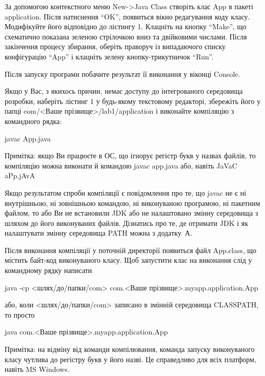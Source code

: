 За допомогою контекстного меню New->Java Class створіть клас App в пакеті application. Після натиснення ``OK'', появиться вікно редагування коду класу. Модифікуйте його відповідно до лістингу 1.
Клацніть на кнопку ``Make'', що схематично показана зеленою стрілочкою вниз та двійковими числами. Після закінчення процесу збирання, оберіть праворуч із випадаючого списку  конфігурацію ``App'' і клацніть зелену кнопку-трикутничок ``Run''.
 
Після запуску програми побачите результат її виконання у віконці Console.

Якщо у Вас, з якихось причин, немає доступу до інтегрованого середовища розробки, наберіть лістинг 1 у будь-якому текстовому редакторі, збережіть його у папці com/<Ваше прізвище>/lab1/application і виконайте компіляцію з командного рядка: 

javac App.java

Примітка: якщо Ви працюєте в ОС, що ігнорує регістр букв у назвах файлів, то компіляцію можна виконати й командою javac app.java або, навіть JaVaC aPp.jAvA

Якщо результатом спроби компіляції є повідомлення про те, що javac не є ні внутрішньою, ні зовнішньою командою, ні виконуваною програмою, ні пакетним файлом, то або Ви не встановили JDK або не налаштовано змінну середовища з шляхом до його виконуваних файлів. Дізнатись про те, де отримати JDK і як налаштувати змінну середовища PATH можна з додатку~А.

Після виконання компіляції у поточній директорії появиться файл App.class, що містить байт-код виконуваного класу. Щоб запустити клас на виконання слід у командному рядку написати 

java -cp <шлях/до/папки/com> com.<Ваше прізвище>.myapp.application.App

або, коли <шлях/до/папки/com> записано в змінній середовища CLASSPATH, то просто

java com.<Ваше прізвище>.myapp.application.App

Примітка: на відміну від команди компілювання, команда запуску виконуваного класу чутлива до регістру букв у його назві. Це справедливо для всіх платформ, навіть MS Windows.

